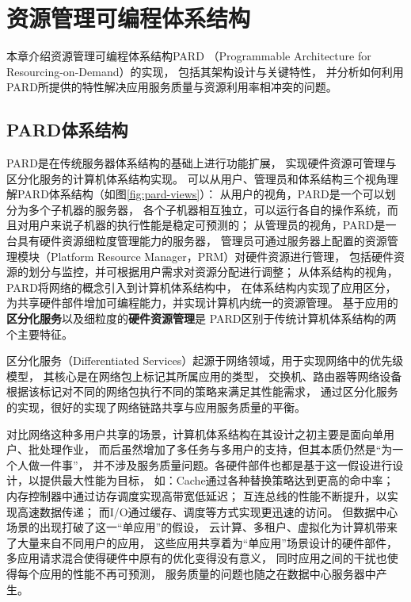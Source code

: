 

\chapter{资源管理可编程体系结构}
\label{chap:pardarch}

本章介绍资源管理可编程体系结构PARD
（Programmable Architecture for Resourcing-on-Demand）\cite{pard:2015}的实现，
包括其架构设计与关键特性，
并分析如何利用PARD所提供的特性解决应用服务质量与资源利用率相冲突的问题。


\section{PARD体系结构}

PARD是在传统服务器体系结构的基础上进行功能扩展，
实现硬件资源可管理与区分化服务的计算机体系结构实现。
可以从用户、管理员和体系结构三个视角理解PARD体系结构（如图\ref{fig:pard-views}）：
从用户的视角，PARD是一个可以划分为多个子机器的服务器，
各个子机器相互独立，可以运行各自的操作系统，而且对用户来说子机器的执行性能是稳定可预测的；
从管理员的视角，PARD是一台具有硬件资源细粒度管理能力的服务器，
管理员可通过服务器上配置的资源管理模块（Platform Resource Manager，PRM）对硬件资源进行管理，
包括硬件资源的划分与监控，并可根据用户需求对资源分配进行调整；
从体系结构的视角，PARD将网络的概念引入到计算机体系结构中，
在体系结构内实现了应用区分，为共享硬件部件增加可编程能力，并实现计算机内统一的资源管理。
基于应用的\textbf{区分化服务}以及细粒度的\textbf{硬件资源管理}是
PARD区别于传统计算机体系结构的两个主要特征。

区分化服务（Differentiated Services）起源于网络领域，用于实现网络中的优先级模型，
其核心是在网络包上标记其所属应用的类型，
交换机、路由器等网络设备根据该标记对不同的网络包执行不同的策略来满足其性能需求，
通过区分化服务的实现，很好的实现了网络链路共享与应用服务质量的平衡。

对比网络这种多用户共享的场景，计算机体系结构在其设计之初主要是面向单用户、批处理作业，
而后虽然增加了多任务与多用户的支持，但其本质仍然是``为一个人做一件事''，
并不涉及服务质量问题。各硬件部件也都是基于这一假设进行设计，以提供最大性能为目标，
如：Cache通过各种替换策略达到更高的命中率；
内存控制器中通过访存调度实现高带宽低延迟；
互连总线的性能不断提升，以实现高速数据传递；
而I/O通过缓存、调度等方式实现更迅速的访问。
但数据中心场景的出现打破了这一``单应用''的假设，
云计算、多租户、虚拟化为计算机带来了大量来自不同用户的应用，
这些应用共享着为``单应用''场景设计的硬件部件，
多应用请求混合使得硬件中原有的优化变得没有意义，
同时应用之间的干扰也使得每个应用的性能不再可预测，
服务质量的问题也随之在数据中心服务器中产生。

